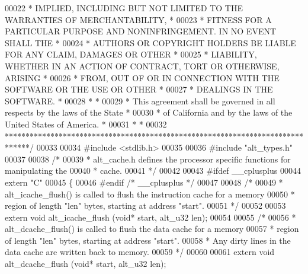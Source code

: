\begin{DoxyCode}
00022 \textcolor{comment}{* IMPLIED, INCLUDING BUT NOT LIMITED TO THE WARRANTIES OF MERCHANTABILITY,    *}
00023 \textcolor{comment}{* FITNESS FOR A PARTICULAR PURPOSE AND NONINFRINGEMENT. IN NO EVENT SHALL THE *}
00024 \textcolor{comment}{* AUTHORS OR COPYRIGHT HOLDERS BE LIABLE FOR ANY CLAIM, DAMAGES OR OTHER      *}
00025 \textcolor{comment}{* LIABILITY, WHETHER IN AN ACTION OF CONTRACT, TORT OR OTHERWISE, ARISING     *}
00026 \textcolor{comment}{* FROM, OUT OF OR IN CONNECTION WITH THE SOFTWARE OR THE USE OR OTHER         *}
00027 \textcolor{comment}{* DEALINGS IN THE SOFTWARE.                                                   *}
00028 \textcolor{comment}{*                                                                             *}
00029 \textcolor{comment}{* This agreement shall be governed in all respects by the laws of the State   *}
00030 \textcolor{comment}{* of California and by the laws of the United States of America.              *}
00031 \textcolor{comment}{*                                                                             *}
00032 \textcolor{comment}{******************************************************************************/}
00033 
00034 \textcolor{preprocessor}{#include <stdlib.h>}
00035 
00036 \textcolor{preprocessor}{#include "alt_types.h"}
00037 
00038 \textcolor{comment}{/*}
00039 \textcolor{comment}{ * alt\_cache.h defines the processor specific functions for manipulating the}
00040 \textcolor{comment}{ * cache.}
00041 \textcolor{comment}{ */}
00042 
00043 \textcolor{preprocessor}{#ifdef \_\_cplusplus}
00044 \textcolor{keyword}{extern} \textcolor{stringliteral}{"C"}
00045 \{
00046 \textcolor{preprocessor}{#endif }\textcolor{comment}{/* \_\_cplusplus */}\textcolor{preprocessor}{}
00047 
00048 \textcolor{comment}{/*}
00049 \textcolor{comment}{ * alt\_icache\_flush() is called to flush the instruction cache for a memory}
00050 \textcolor{comment}{ * region of length "len" bytes, starting at address "start".}
00051 \textcolor{comment}{ */}
00052 
00053 \textcolor{keyword}{extern} \textcolor{keywordtype}{void} alt_icache_flush (\textcolor{keywordtype}{void}* start, alt_u32 len);
00054 
00055 \textcolor{comment}{/*}
00056 \textcolor{comment}{ * alt\_dcache\_flush() is called to flush the data cache for a memory}
00057 \textcolor{comment}{ * region of length "len" bytes, starting at address "start".}
00058 \textcolor{comment}{ * Any dirty lines in the data cache are written back to memory.}
00059 \textcolor{comment}{ */}
00060 
00061 \textcolor{keyword}{extern} \textcolor{keywordtype}{void} alt_dcache_flush (\textcolor{keywordtype}{void}* start, alt_u32 len);

\end{DoxyCode}
